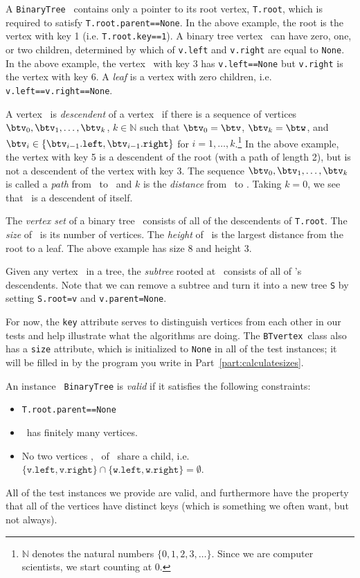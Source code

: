 \documentclass[11pt]{article}
\begin{document}
\begin{enumerate}
 A \texttt{BinaryTree} \treeT\  contains only a pointer to its root vertex, \texttt{T.root}, which is required to satisfy \texttt{T.root.parent==None}. In the above example, 
 the root is the vertex with key 1 (i.e. \texttt{T.root.key==1}).
 A binary tree vertex \btv\ can have zero, one, or two children, determined by which of \texttt{v.left} and  \texttt{v.right} are equal to \texttt{None}.    In the above example, the vertex \btv\ with key 3 has 
 \texttt{v.left==None} but \texttt{v.right} is the vertex with key 6.
 A {\em leaf} is a vertex with zero children, i.e. \texttt{v.left==v.right==None}. 
 
 A vertex \btw\ is {\em descendent} of a vertex \btv\ if there is a sequence of vertices $\btv_0,\btv_1,\ldots,\btv_k$, $k\in \mathbb{N}$ such that $\btv_0=\btv$, $\btv_k=\btw$, and 
 $\btv_i \in \{\btv_{i-1}.\texttt{left},\btv_{i-1}.\texttt{right}\}$ for $i=1,\ldots,k$.\footnote{$\mathbb{N}$ denotes the natural numbers $\{0,1,2,3,\ldots\}$.  Since we are computer scientists, we start counting at 0.}
 In the above example, the vertex with key 5 is a descendent of the root (with a path of length 2), but is not a descendent of the vertex with key 3.
 The sequence $\btv_0,\btv_1,\ldots,\btv_k$ is called a {\em path} from \btv\ to \btw\ and $k$ is the {\em distance} from \btv\ to \btw. Taking $k=0$, we see that \btv\ is a descendent of itself.

 The {\em vertex set} of a binary tree \treeT\ consists of all of the descendents of \texttt{T.root}. The {\em size} of \treeT\ is its number of vertices. The {\em height} of \treeT\ is the largest distance from the root to a leaf.  The above example has size 8 and height 3.
 
 Given any vertex \btv\ in a tree, the {\em subtree} rooted at \btv\ consists of all of \btv's descendents.  Note that we can remove a subtree and turn it into a new tree \texttt{S} by setting
 \texttt{S.root=v} and \texttt{v.parent=None}.

 For now, the \texttt{key} attribute serves to distinguish vertices from each other in our tests and help illustrate what the algorithms are doing.  The \texttt{BTvertex}\ class
 also has a \texttt{size} attribute, which is initialized to \texttt{None} in all of the test instances; it will be filled in by the program you write in Part~\ref{part:calculatesizes}.

 An instance \treeT\ \texttt{BinaryTree} is {\em valid} if it satisfies the following constraints: \begin{itemize}
     \item \texttt{T.root.parent==None}
     \item \treeT\ has finitely many vertices.
     \item No two vertices \btv, \btw\ of \treeT\ share a child, i.e. 
     $\{\texttt{v.left},\texttt{v.right}\} \cap \{\texttt{w.left},\texttt{w.right}\} = \emptyset$. 
 \end{itemize}
 All of the test instances we provide are valid, and furthermore have the property that all of the vertices have distinct keys (which is something we often want, but not always).


\end{enumerate}
\end{document}
